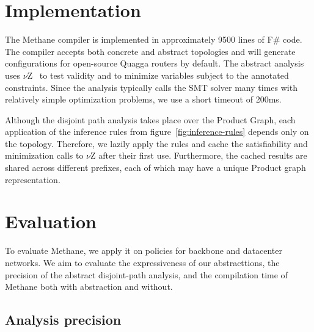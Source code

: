 \documentclass[numbers, 10pt, preprint]{sigplanconf}
\newcommand{\sysname}{{\small \sf Methane}\xspace}
\begin{document}
%
%
%
%

\section{Implementation}
\label{sec:implementation}

The \sysname compiler is implemented in approximately 9500 lines of F\# code. The compiler accepts both concrete and abstract topologies and will generate configurations for open-source Quagga routers by default. The abstract analysis uses $\nu$Z~\cite{z3opt} to test validity and to minimize variables subject to the annotated constraints. Since the analysis typically calls the SMT solver many times with relatively simple optimization problems, we use a short timeout of 200ms.

Although the disjoint path analysis takes place over the Product Graph, each application of the inference rules from figure~\ref{fig:inference-rules} depends only on the topology. Therefore, we lazily apply the rules and cache the satisfiability and minimization calls to $\nu$Z after their first use. Furthermore, the cached results are shared across different prefixes, each of which may have a unique Product graph representation.

\section{Evaluation}
\label{sec:evaluation}

To evaluate \sysname, we apply it on policies for backbone and datacenter networks. We aim to evaluate the expressiveness of our abstracttions, the precision of the abstract disjoint-path analysis, and the compilation time of \sysname both with abstraction and without.

\subsection{Analysis precision}
\end{document}
